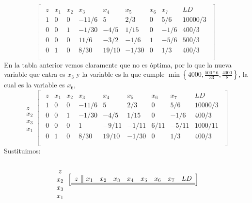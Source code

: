 \documentclass[11pt,letterpaper]{article}
\begin{document}
\begin{enumerate}
\begin{equation}
\begin{bmatrix}
\begin{array}{c||cccccccc}
  z & x_1 & x_2 & x_3 & x_4 & x_5 & x_6 & x_7 & LD\\ \hline \hline
  1 & 0 & 0 &-11/6 & 5 & 2/3 & 0 & 5/6 & 10000/3\\ 
  0 & 0 & 1 &-1/30 & -4/5 & 1/15 & 0 &-1/6 & 400/3  \\
  0 & 0 & 0 &11/6  & -3/2 & -1/6 & 1 & -5/6& 500/3 \\
  0 & 1 & 0 & 8/30 & 19/10 & -1/30 & 0 & 1/3 & 400/3 \\
\end{array}
\end{bmatrix}
\end{equation}
En la tabla anterior vemos claramente que no es óptima, por lo que la nueva variable que entra es $x_3$ y la variable es la que cumple $\min \left\{4000, \frac{500*6}{33},\frac{4000}{8} \right\}$, la cual es la variable es $x_6$,
\begin{equation} 
\begin{array}{c}
\\
z \\ 
x_2 \\
x_3 \\
x_1
\end{array}
\begin{bmatrix}
\begin{array}{c||cccccccc}
  z & x_1 & x_2 & x_3 & x_4 & x_5 & x_6 & x_7 & LD\\ \hline \hline
  1 & 0 & 0 &-11/6 & 5 & 2/3 & 0 & 5/6 & 10000/3\\ 
  0 & 0 & 1 &-1/30 & -4/5 & 1/15 & 0 &-1/6 & 400/3  \\
  0 & 0 & 0 & 1  & -9/11 & -1/11 & 6/11 & -5/11& 1000/11 \\
  0 & 1 & 0 & 8/30 & 19/10 & -1/30 & 0 & 1/3 & 400/3 \\
\end{array}
\end{bmatrix}
\end{equation}
Sustituimos:
\begin{equation} 
\begin{array}{c}
\\
z \\ 
x_2 \\
x_3 \\
x_1
\end{array}
\begin{bmatrix}
\begin{array}{c||cccccccc}
  z & x_1 & x_2 & x_3 & x_4 & x_5 & x_6 & x_7 & LD\\ \hline \hline

\end{array}
\end{bmatrix}
\end{equation}
\end{enumerate}
\end{document}
